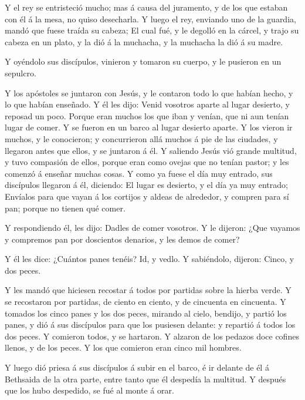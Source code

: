  Y el rey se entristeció mucho; mas á causa del juramento,
y de los que estaban con él á la mesa, no quiso desecharla.
 Y luego el rey, enviando uno de la guardia, mandó que
fuese traída su cabeza;  El cual fué, y le degolló en la
cárcel, y trajo su cabeza en un plato, y la dió á la muchacha, y la
muchacha la dió á su madre.

 Y oyéndolo sus discípulos, vinieron y tomaron su cuerpo, y
le pusieron en un sepulcro.

 Y los apóstoles se juntaron con Jesús, y le contaron todo
lo que habían hecho, y lo que habían enseñado.  Y él les
dijo: Venid vosotros aparte al lugar desierto, y reposad un poco. Porque
eran muchos los que iban y venían, que ni aun tenían lugar de comer.
 Y se fueron en un barco al lugar desierto aparte.
 Y los vieron ir muchos, y le conocieron; y concurrieron
allá muchos á pie de las ciudades, y llegaron antes que ellos, y se
juntaron á él.  Y saliendo Jesús vió grande multitud, y
tuvo compasión de ellos, porque eran como ovejas que no tenían pastor; y
les comenzó á enseñar muchas cosas.  Y como ya fuese el día
muy entrado, sus discípulos llegaron á él, diciendo: El lugar es
desierto, y el día ya muy entrado;  Envíalos para que vayan
á los cortijos y aldeas de alrededor, y compren para sí pan; porque no
tienen qué comer.

 Y respondiendo él, les dijo: Dadles de comer vosotros. Y
le dijeron: ¿Que vayamos y compremos pan por doscientos denarios, y les
demos de comer?

 Y él les dice: ¿Cuántos panes tenéis? Id, y vedlo. Y
sabiéndolo, dijeron: Cinco, y dos peces.

 Y les mandó que hiciesen recostar á todos por partidas
sobre la hierba verde.  Y se recostaron por partidas, de
ciento en ciento, y de cincuenta en cincuenta.  Y tomados
los cinco panes y los dos peces, mirando al cielo, bendijo, y partió los
panes, y dió á sus discípulos para que los pusiesen delante: y repartió
á todos los dos peces.  Y comieron todos, y se hartaron.
 Y alzaron de los pedazos doce cofines llenos, y de los
peces.  Y los que comieron eran cinco mil hombres.

 Y luego dió priesa á sus discípulos á subir en el barco, é
ir delante de él á Bethsaida de la otra parte, entre tanto que él
despedía la multitud.  Y después que los hubo despedido, se
fué al monte á orar.

